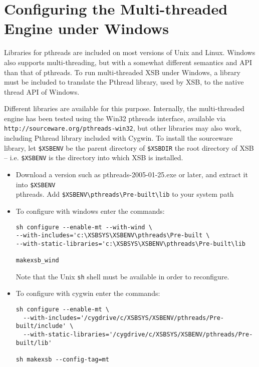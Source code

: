 \section{Configuring the Multi-threaded Engine under Windows} \label{sec:mt-windows}

Libraries for pthreads are included on most versions of Unix and
Linux.  Windows also supports multi-threading, but with a somewhat
different semantics and API than that of pthreads.  To run
multi-threaded XSB under Windows, a library must be included to
translate the Pthread library, used by XSB, to the native thread API
of Windows.

Different libraries are available for this purpose.  Internally, the
multi-threaded engine has been tested using the Win32 pthreads
interface, available via {\tt http://sourceware.org/pthreads-win32},
but other libraries may also work, including Pthread library included
with Cygwin.  To install the sourceware library, let {\tt \$XSBENV} be
the parent directory of {\tt \$XSBDIR} the root directory of XSB --
i.e. {\tt \$XSBENV} is the directory into which XSB is installed.

\begin{itemize}
\item Download a version such as pthreads-2005-01-25.exe or later, and
  extract it into {\tt \$XSBENV}\\pthreads.  Add
  \verb|$XSBENV\pthreads\Pre-built\lib| to your system path

\item To configure with windows enter the commands: 
\begin{verbatim}
sh configure --enable-mt --with-wind \
--with-includes='c:\XSBSYS\XSBENV\pthreads\Pre-built \
--with-static-libraries='c:\XSBSYS\XSBENV\pthreads\Pre-built\lib

makexsb_wind
\end{verbatim}
Note that the Unix {\tt sh} shell must be available in order to
reconfigure.

\item To configure with cygwin enter the commands:
\begin{verbatim}
sh configure --enable-mt \
  --with-includes='/cygdrive/c/XSBSYS/XSBENV/pthreads/Pre-built/include' \
  --with-static-libraries='/cygdrive/c/XSBSYS/XSBENV/pthreads/Pre-built/lib'

sh makexsb --config-tag=mt
\end{verbatim}

\end{itemize}

